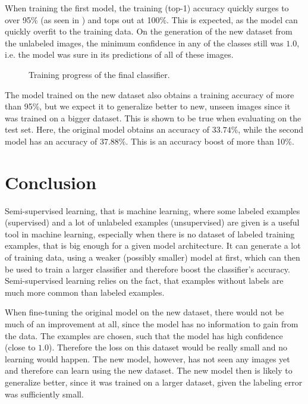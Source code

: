 \documentclass[a4paper,onecolumn,oneside,11pt,english,bibliography=totoc]{article}
\newcommand{\1}{\mathds{1}}
\theoremstyle{breakit}
\theoremstyle{break}
\begin{document}
	When training the first model, the training (top-1) accuracy quickly surges to over 95\% (as seen in ) and tops out at 100\%. This is expected, as the model can quickly overfit to the training data. On  the generation of the new dataset from the unlabeled images, the minimum confidence in any of the classes still was $1.0$, i.e. the model was sure in its predictions of all of these images.
	
	\begin{figure}[h]
	    \centering
	    \resizebox{\textwidth}{!}{}
	    \caption{Training progress of the final classifier.}
	    \label{fig:training_classifier}
	\end{figure}
	
	The model trained on the new dataset also obtains a training accuracy of more than 95\%, but we expect it to generalize better to new, unseen images since it was trained on a bigger dataset.
	This is shown to be true when evaluating on the test set. Here, the original model obtains an accuracy of $33.74\%$, while the second model has an accuracy of $37.88\%$. This is an accuracy boost of more than 10\%.
	
	\section*{Conclusion}
	Semi-supervised learning, that is machine learning, where some labeled examples (supervised) and a lot of unlabeled examples (unsupervised) are given is a useful tool in machine learning, especially when there is no dataset of labeled training examples, that is big enough for a given model architecture. It can generate a lot of training data, using a weaker (possibly smaller) model at  first, which can then be used to train a larger classifier and therefore boost the classifier's accuracy. Semi-supervised learning relies on the fact, that examples without labels are much more common than labeled examples.
	
	When fine-tuning the original model on the new dataset, there would not be much of an improvement at all, since the model has no information to gain from the data. The examples are chosen, such that the model has high confidence (close to $1.0$). Therefore the loss on this dataset would be really small and no learning would happen. The new model, however, has not seen any images yet and therefore can learn using the new dataset. The new model then is likely to generalize better, since it was trained on a larger dataset, given the labeling error was sufficiently small.
	
\end{document}
